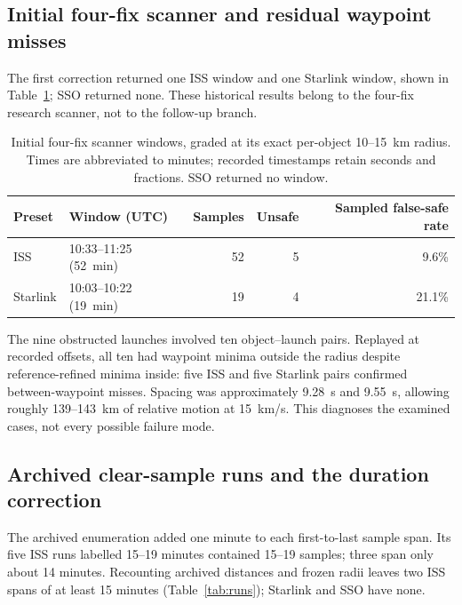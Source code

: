 \documentclass[11pt,a4paper]{article}
\begin{document}
\subsection{Initial four-fix scanner and residual waypoint misses}

The first correction returned one ISS window and one Starlink window,
shown in Table~\ref{tab:fixed}; SSO returned none. These historical results
belong to the four-fix research scanner, not to the follow-up branch.

\begin{table}[htbp]
\centering
\small
\begin{tabular}{llrrr}
\toprule
Preset & Window (UTC) & Samples & Unsafe & Sampled false-safe rate \\
\midrule
ISS      & 10:33--11:25 (52~min) & 52 & 5 & 9.6\% \\
Starlink & 10:03--10:22 (19~min) & 19 & 4 & 21.1\% \\
\bottomrule
\end{tabular}
\caption{Initial four-fix scanner windows, graded at its exact per-object
10--15~km radius. Times are abbreviated to minutes; recorded timestamps
retain seconds and fractions. SSO returned no window.}
\label{tab:fixed}
\end{table}

The nine obstructed launches involved ten object--launch pairs. Replayed
at recorded offsets, all ten had waypoint minima outside the radius despite
reference-refined minima inside: five ISS and five Starlink pairs confirmed
between-waypoint misses. Spacing was approximately 9.28~s and 9.55~s,
allowing roughly 139--143~km of relative motion at 15~km/s. This diagnoses
the examined cases, not every possible failure mode.

\subsection{Archived clear-sample runs and the duration correction}
\label{sec:archived-runs}

The archived enumeration added one minute to each first-to-last sample
span. Its five ISS runs labelled 15--19 minutes contained 15--19 samples;
three span only about 14 minutes. Recounting archived distances and frozen
radii leaves two ISS spans of at least 15 minutes
(Table~\ref{tab:runs}); Starlink and SSO have none.
\end{document}
